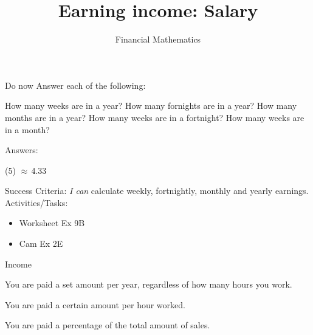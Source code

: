 \documentclass[aspectratio=169,10pt]{beamer}
\title{Earning income: Salary}
\subtitle{Financial Mathematics}
\date{%
}
\begin{document}
\begin{frame}{Do now}
  Answer each of the following:
  \begin{tasks}
    \task How many weeks are in a year?
    \task How many fornights are in a year?
    \task How many months are in a year?
    \task How many weeks are in a fortnight?
    \task How many weeks are in a month?
  \end{tasks}\pause
  Answers:
  \begin{tasks}(5)
    \task {}
    \task {}
    \task {}
    \task {}
    \task \pause$\approx\,$4.33
  \end{tasks}
\end{frame}

\frame{\titlepage}

\begin{frame}
  \begin{outcome}
    Success Criteria:\newline
    \textit{I can} calculate weekly, fortnightly, monthly and yearly earnings.\newline
    Activities/Tasks:
    \begin{itemize}
      \item Worksheet Ex 9B
      \item Cam Ex 2E
    \end{itemize}
  \end{outcome}
\end{frame}

\begin{frame}{Income}
  \begin{definition}[Salary]
    You are paid a set amount per year, regardless of how many hours you work.
  \end{definition}\pause
  \begin{definition}
    You are paid a certain amount per hour worked.​
  \end{definition}\pause
  \begin{definition}[Comission]
    You are paid a percentage of the total amount of sales.​
  \end{definition}
\end{frame}
\end{document}
